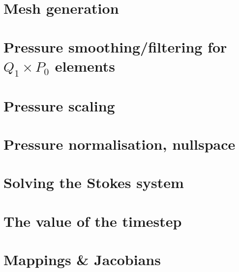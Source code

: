 \section{Mesh generation} \label{sec:meshes}  %
\newpage %
\section{Pressure smoothing/filtering for $Q_1\times P_0$ elements \label{psmoothing}} 
\newpage %
\section{Pressure scaling \label{pscaling}}  %
\newpage %
\section{Pressure normalisation, nullspace\label{ss_pnorm}}  %
\newpage %
\section{Solving the Stokes system \label{sec:solvers}}  %
\newpage %
\section{The value of the timestep}\label{ss:cfl}  %
\newpage %
\section{Mappings \& Jacobians \label{ss:mappings}}  %
\newpage %

